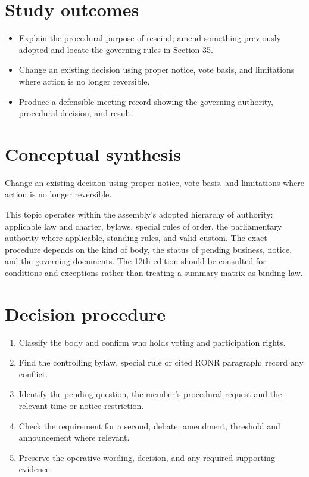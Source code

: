 \documentclass[11pt]{article}
\begin{document}
\SuiteOpen
{}
\section{Study outcomes}
\begin{itemize}[leftmargin=*,itemsep=4pt]
\item Explain the procedural purpose of rescind; amend something previously adopted and locate the governing rules in Section 35.
\item Change an existing decision using proper notice, vote basis, and limitations where action is no longer reversible.
\item Produce a defensible meeting record showing the governing authority, procedural decision, and result.
\end{itemize}

\section{Conceptual synthesis}
Change an existing decision using proper notice, vote basis, and limitations where action is no longer reversible.

This topic operates within the assembly’s adopted hierarchy of authority: applicable law and charter, bylaws, special rules of order, the parliamentary authority where applicable, standing rules, and valid custom. The exact procedure depends on the kind of body, the status of pending business, notice, and the governing documents. The 12th edition should be consulted for conditions and exceptions rather than treating a summary matrix as binding law.
\section{Decision procedure}
\begin{enumerate}[leftmargin=*,itemsep=4pt]
\item Classify the body and confirm who holds voting and participation rights.
\item Find the controlling bylaw, special rule or cited RONR paragraph; record any conflict.
\item Identify the pending question, the member’s procedural request and the relevant time or notice restriction.
\item Check the requirement for a second, debate, amendment, threshold and announcement where relevant.
\item Preserve the operative wording, decision, and any required supporting evidence.
\end{enumerate}
\end{document}
